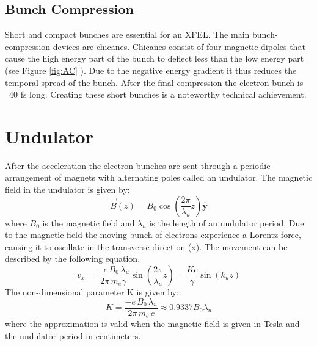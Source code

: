 \subsection{Bunch Compression}
Short and compact bunches are essential for an XFEL. The main bunch-compression devices are chicanes. Chicanes consist of four magnetic dipoles that cause the high energy part of the bunch to deflect less than the low energy part (see Figure \ref{fig:AC} ). Due to the negative energy gradient it thus reduces the temporal spread of the bunch. After the final compression the electron bunch is ~40 fs long. Creating these short bunches is a noteworthy technical achievement.






\section{Undulator}
After the acceleration the electron bunches are sent through a periodic arrangement of magnets with alternating poles called an undulator. The magnetic field in the undulator is given by:
\begin{equation}\vec{B}(z) = B_0\cos{(\frac{2\pi}{\lambda_u}z)}\hat{\mathbf{y}}\label{eq:bz}\end{equation}
where $B_0$ is the magnetic field and $\lambda_u$ is the length of an undulator period.
Due to the magnetic field the moving bunch of electrons experience a Lorentz force, causing it to oscillate in the transverse direction (x). The movement can be described by the following equation. 
\begin{equation}v_x = \frac{-e\,B_0\,\lambda_u}{2\pi\,m_e\gamma} \sin{(\frac{2\pi}{\lambda_u}z)} = \frac{K c}{\gamma} \sin{(k_uz)}\label{eq:vx}\end{equation}
The non-dimensional parameter K is given by:
\[K =  \frac{-e\,B_0\,\lambda_u}{2\pi\,m_e \, c}  \approx 0.9337 B_0 \lambda_u\]
where the approximation is valid when the magnetic field is given in Tesla and the undulator period in centimeters.

